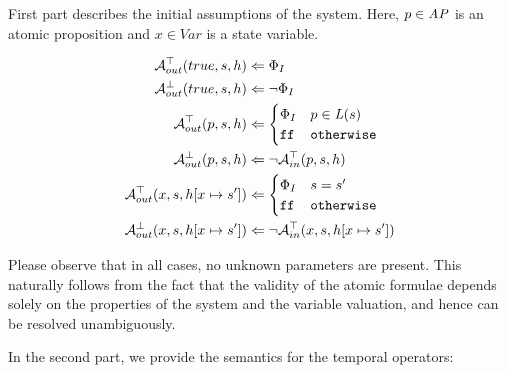 First part describes the initial assumptions of the system. Here, $p \in \mathit{AP}$ is an atomic proposition and $x \in Var$ is a state variable.

\begin{align*}
	\mathcal{A}^\top_{out}(true, s, h) & \Leftarrow \Phi_I \\
	\mathcal{A}^\bot_{out}(true, s, h) & \Leftarrow \neg \Phi_I \\
	\mathcal{A}^\top_{out}(p, s, h) & \Leftarrow 
	\begin{cases}
		\Phi_I & p \in \mathit{L}(s) \\
		\texttt{ff} & \texttt{otherwise} \\
	\end{cases}
	\\
	\mathcal{A}^\bot_{out}(p, s, h) & \Leftarrow \neg \mathcal{A}^\top_{in}(p, s, h) \\
	\mathcal{A}^\top_{out}(x, s, h[ x \mapsto s' ]) & \Leftarrow
	\begin{cases}
		\Phi_I & s = s' \\
		\texttt{ff} & \texttt{otherwise}
	\end{cases}
	\\
	\mathcal{A}^\bot_{out}(x, s, h[ x \mapsto s']) & \Leftarrow \neg \mathcal{A}^\top_{in}(x, s, h[ x \mapsto s' ]) \\
\end{align*}

Please observe that in all cases, no unknown parameters are present. This naturally follows from the fact that the validity of the atomic formulae depends solely on the properties of the system and the variable valuation, and hence can be resolved unambiguously.

In the second part, we provide the semantics for the temporal operators:

